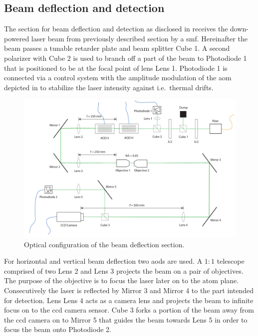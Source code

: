 \subsection{Beam deflection and detection}\label{subsec:setup_deflection_detection}

The section for beam deflection and detection as disclosed in
 receives the down-powered laser beam from
previously described section by a \gls{smf}. Hereinafter the beam passes a
tunable retarder plate and beam splitter Cube 1. A second polarizer with
Cube 2 is used to branch off a part of the beam to Photodiode 1 that is
positioned to be at the focal point of lens Lens 1. Photodiode 1 is connected
via a control system with the amplitude modulation of the \gls{aom} depicted
in  to stabilize the laser intensity against
i.e.\ thermal drifts.
\begin{figure}[htb]
  \centering
  \includegraphics[width=\textwidth]{../figure/setup/beam-deflection.pdf}
  \caption{Optical configuration of the beam deflection section.
  }\label{fig:setup_beam_deflection}
\end{figure}
For horizontal and vertical beam deflection two \gls{aod}s are used. A $1:1$
telescope comprised of two Lens \num{2} and Lens \num{3} projects the beam on
a pair of objectives. The purpose of the objective is to focus the laser later
on to the atom plane. Consecutively the laser is reflected by Mirror \num{3}
and Mirror \num{4} to the part intended for detection. Lens Lens \num{4} acts
as a camera lens and projects the beam to infinite focus on to the \gls{ccd}
camera sensor. Cube \num{3} forks a portion of the beam away from the
\gls{ccd} camera on to Mirror \num{5} that guides the beam towards Lens
\num{5} in order to focus the beam onto Photodiode \num{2}.

